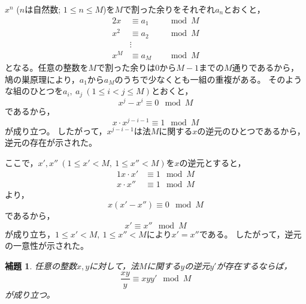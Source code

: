 \documentclass{article}
\makeatletter
\renewenvironment{proof}[1][\proofname]{\par
        \pushQED{\qed}
        \normalfont
        \topsep6\p@\@plus6\p@ \trivlist
        \item[\hskip\labelsep{\bfseries #1}\@addpunct{\bfseries}]\ignorespaces
    }{%
        \popQED\endtrivlist\@endpefalse
    }
\renewcommand{\proofname}{証明.}
\newtheorem{lemma}{補題}
\makeatother
\begin{document}
\begin{proof}
    $x^n$ ($n$は自然数; $1 \leq n \leq M$)を$M$で割った余りをそれぞれ$a_n$とおくと，
    \begin{alignat}{2}
        x   &\equiv a_1   & &\mod{M} \\
        x^2 &\equiv a_2 & &\mod{M} \\
            &\vdots& & \\
        x^M &\equiv a_M & &\mod{M}
    \end{alignat}
    となる。任意の整数を$M$で割った余りは0から$M - 1$までの$M$通りであるから，
    鳩の巣原理により，$a_1$から$a_M$のうちで少なくとも一組の重複がある。
    そのような組のひとつを$a_i,\ a_j\ (1 \leq i < j \leq M)$とおくと，
    \begin{equation}
        x^j - x^i \equiv 0 \mod{M}
    \end{equation}
    であるから，
    \begin{equation}
        x \cdot x^{j - i - 1} \equiv 1 \mod{M}
    \end{equation}
    が成り立つ。
    したがって，$x^{j - i - 1}$は法$M$に関する$x$の逆元のひとつであるから，逆元の存在が示された。

    ここで，$x', x''\ (1 \leq x' < M,\ 1 \leq x'' < M)$を$x$の逆元とすると，
    \begin{alignat}{1}
        x \cdot x'  &\equiv 1 \mod{M} \\
        x \cdot x'' &\equiv 1 \mod{M}
    \end{alignat}
    より，
    \begin{equation}
        x (x' - x'') \equiv 0 \mod{M}
    \end{equation}
    であるから，
    \begin{equation}
        x' \equiv x'' \mod{M}
    \end{equation}
    が成り立ち，$1 \leq x' < M,\ 1 \leq x'' < M$により$x' = x''$である。
    したがって，逆元の一意性が示された。
\end{proof}

\begin{screen}
    \begin{lemma}
        \label{lemma:inv:2}
        任意の整数$x, y$に対して，法$M$に関する$y$の逆元$y'$が存在するならば，
        \begin{equation}
            \frac{xy}{y} \equiv xyy' \mod{M}
        \end{equation}
        が成り立つ。
    \end{lemma}
\end{screen}
\end{document}
